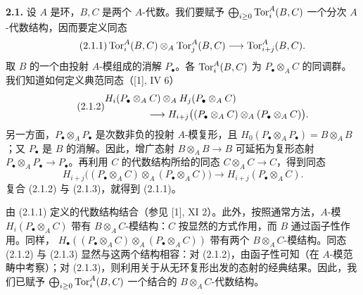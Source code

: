 \textbf{2.1.} 设 \(A\) 是环，\(B,C\) 是两个 \(A\)-代数。我们要赋予 \(\bigoplus_{i\geq0}\operatorname{Tor}_i^A(B,C)\) 一个分次 \(A\)-代数结构，因而要定义同态
\begin{equation}\tag{2.1.1}
 \operatorname{Tor}_i^A(B,C)\otimes_A\operatorname{Tor}_j^A(B,C)
 \longrightarrow\operatorname{Tor}_{i+j}^A(B,C).
\end{equation}
取 \(B\) 的一个由投射 \(A\)-模组成的消解 \(P_\bullet\)。各 \(\operatorname{Tor}_i^A(B,C)\) 为 \(P_\bullet\otimes_A C\) 的同调群。我们知道如何定义典范同态（[1], IV 6）
\begin{equation}\tag{2.1.2}
\begin{aligned}
 &H_i(P_\bullet\otimes_A C)\otimes_A H_j(P_\bullet\otimes_A C)\\
 &\hspace{15mm}\longrightarrow
 H_{i+j}\bigl((P_\bullet\otimes_A C)\otimes_A(P_\bullet\otimes_A C)\bigr).
\end{aligned}
\end{equation}
另一方面，\(P_\bullet\otimes_A P_\bullet\) 是次数非负的投射 \(A\)-模复形，且
\(H_0(P_\bullet\otimes_A P_\bullet)=B\otimes_A B\)；又 \(P_\bullet\) 是 \(B\) 的消解。因此，增广态射 \(B\otimes_A B\to B\) 可延拓为复形态射
\(P_\bullet\otimes_A P_\bullet\to P_\bullet\)。再利用 \(C\) 的代数结构所给的同态 \(C\otimes_A C\to C\)，得到同态
\begin{equation}\tag{2.1.3}
 H_{i+j}\bigl((P_\bullet\otimes_A C)\otimes_A(P_\bullet\otimes_A C)\bigr)
 \longrightarrow H_{i+j}(P_\bullet\otimes_A C).
\end{equation}
复合 (2.1.2) 与 (2.1.3)，就得到 (2.1.1)。

由 (2.1.1) 定义的代数结构结合（参见 [1], XI 2）。此外，按照通常方法，\(A\)-模 \(H_i(P_\bullet\otimes_A C)\) 带有 \(B\otimes_A C\)-模结构：\(C\) 按显然的方式作用，而 \(B\) 通过函子性作用。同样，
\(H_\bullet((P_\bullet\otimes_A C)\otimes_A(P_\bullet\otimes_A C))\) 带有两个 \(B\otimes_A C\)-模结构。同态 (2.1.2) 与 (2.1.3) 显然与这两个结构相容：对 (2.1.2)，由函子性可知（在 \(A\)-模范畴中考察）；对 (2.1.3)，则利用关于从无环复形出发的态射的经典结果。因此，我们已赋予
\(\bigoplus_{i\geq0}\operatorname{Tor}_i^A(B,C)\) 一个结合的 \(B\otimes_A C\)-代数结构。


